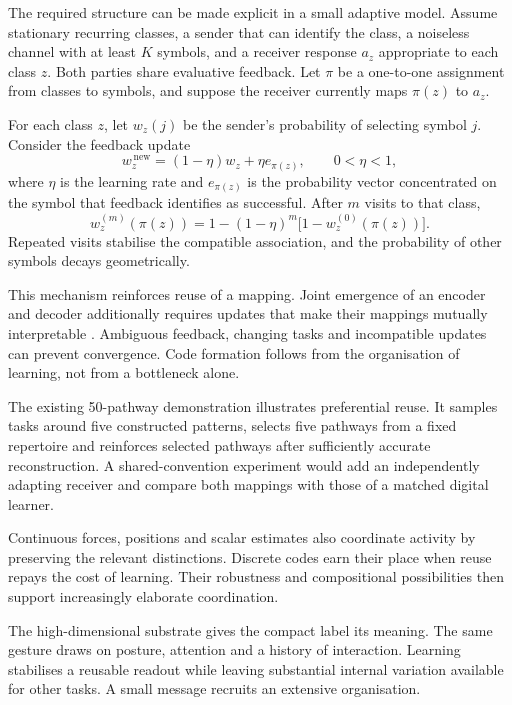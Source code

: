 \documentclass[11pt,a4paper]{article}
\begin{document}
The required structure can be made explicit in a small adaptive model. Assume stationary recurring classes, a sender that can identify the class, a noiseless channel with at least \(K\) symbols, and a receiver response \(a_z\) appropriate to each class \(z\). Both parties share evaluative feedback. Let \(\pi\) be a one-to-one assignment from classes to symbols, and suppose the receiver currently maps \(\pi(z)\) to \(a_z\).

For each class \(z\), let \(w_z(j)\) be the sender's probability of selecting symbol \(j\). Consider the feedback update
\begin{equation}
 w_z^{\,\mathrm{new}}=(1-\eta)w_z+\eta e_{\pi(z)},
 \qquad 0<\eta<1,
 \label{eq:codelearning}
\end{equation}
where \(\eta\) is the learning rate and \(e_{\pi(z)}\) is the probability vector concentrated on the symbol that feedback identifies as successful. After \(m\) visits to that class,
\begin{equation}
 w_z^{(m)}(\pi(z))
 =1-(1-\eta)^m\bigl[1-w_z^{(0)}(\pi(z))\bigr].
 \label{eq:codeconvergence}
\end{equation}
Repeated visits stabilise the compatible association, and the probability of other symbols decays geometrically.

This mechanism reinforces reuse of a mapping. Joint emergence of an encoder and decoder additionally requires updates that make their mappings mutually interpretable \citep{barbieri2018}. Ambiguous feedback, changing tasks and incompatible updates can prevent convergence. Code formation follows from the organisation of learning, not from a bottleneck alone.

The existing 50-pathway demonstration illustrates preferential reuse. It samples tasks around five constructed patterns, selects five pathways from a fixed repertoire and reinforces selected pathways after sufficiently accurate reconstruction. A shared-convention experiment would add an independently adapting receiver and compare both mappings with those of a matched digital learner.

Continuous forces, positions and scalar estimates also coordinate activity by preserving the relevant distinctions. Discrete codes earn their place when reuse repays the cost of learning. Their robustness and compositional possibilities then support increasingly elaborate coordination.

The high-dimensional substrate gives the compact label its meaning. The same gesture draws on posture, attention and a history of interaction. Learning stabilises a reusable readout while leaving substantial internal variation available for other tasks. A small message recruits an extensive organisation.
\end{document}
